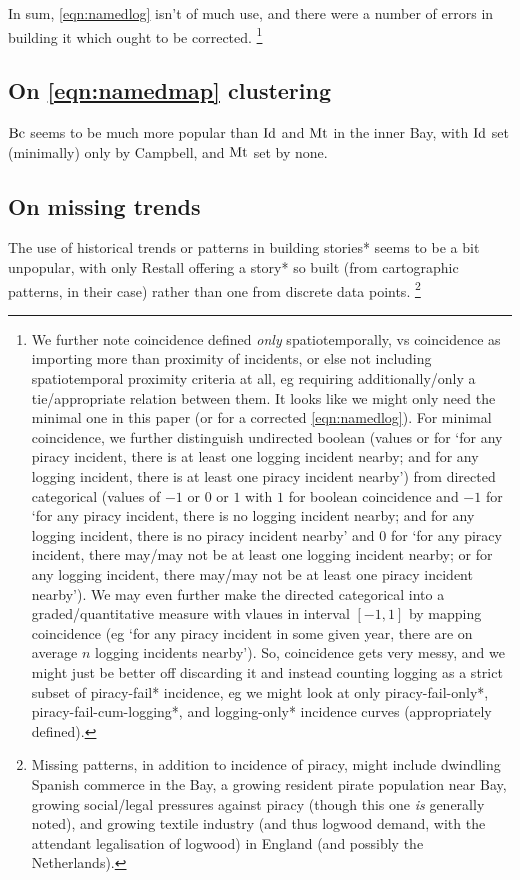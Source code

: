 		In sum, \ref{eqn:namedlog} isn't of much use, and there were a number of errors in building it which ought to be corrected.%
		\footnote{We further note coincidence defined \emph{only} spatiotemporally, vs coincidence as importing more than proximity of incidents, or else not including spatiotemporal proximity criteria at all, eg requiring additionally/only a tie/appropriate relation between them. It looks like we might only need the minimal one in this paper (or for a corrected \ref{eqn:namedlog}). For minimal coincidence, we further distinguish undirected boolean (values  or  for `for any piracy incident, there is at least one logging incident nearby; and for any logging incident, there is at least one piracy incident nearby') from directed categorical (values of \(-1\) or \(0\) or \(1\) with \(1\) for boolean coincidence and \(-1\) for `for any piracy incident, there is no logging incident nearby; and for any logging incident, there is no piracy incident nearby' and \(0\) for `for any piracy incident, there may/may not be at least one logging incident nearby; or for any logging incident, there may/may not be at least one piracy incident nearby'). We may even further make the directed categorical into a graded/quantitative measure with vlaues in interval \([-1,1]\) by mapping coincidence  (eg `for any piracy incident in some given year, there are on average \(n\) logging incidents nearby'). So, coincidence gets very messy, and we might just be better off discarding it and instead counting logging as a strict subset of piracy-fail* incidence, eg we might look at only piracy-fail-only*, piracy-fail-cum-logging*, and logging-only* incidence curves (appropriately defined).}
	\subsection{On \ref{eqn:namedmap} clustering}
	\label{ss:onmapclusters}
		\(\operatorname{Bc}\) seems to be much more popular than \(\operatorname{Id}\) and \(\operatorname{Mt}\) in the inner Bay, with \(\operatorname{Id}\) set (minimally) only by Campbell, and \(\operatorname{Mt}\) set by none.
	\subsection{On missing trends}
	\label{ss:onmissgtrends}
		The use of historical trends or patterns in building stories* seems to be a bit unpopular, with only Restall offering a story* so built (from cartographic patterns, in their case) rather than one from discrete data points.%
		\footnote{Missing patterns, in addition to incidence of piracy, might include dwindling Spanish commerce in the Bay, a growing resident pirate population near Bay, growing social/legal pressures against piracy (though this one \emph{is} generally noted), and growing textile industry (and thus logwood demand, with the attendant legalisation of logwood) in England (and possibly the Netherlands).}
